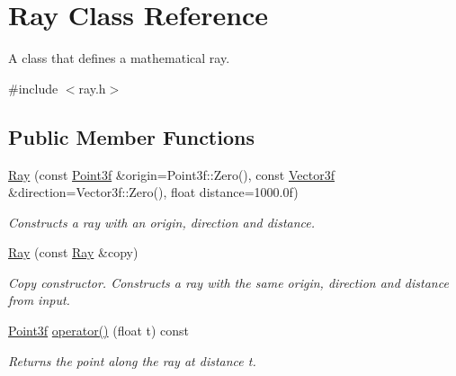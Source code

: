 \hypertarget{class_ray}{}\section{Ray Class Reference}
\label{class_ray}


A class that defines a mathematical ray.  




{\ttfamily \#include $<$ray.\+h$>$}

\subsection*{Public Member Functions}
\begin{DoxyCompactItemize}
\item 
\mbox{\hyperlink{class_ray_a2a7cfa3d7fc1cf6bb6365fb21b48a0b0}{Ray}} (const \mbox{\hyperlink{class_point}{Point3f}} \&origin=Point3f\+::\+Zero(), const \mbox{\hyperlink{class_vector3}{Vector3f}} \&direction=Vector3f\+::\+Zero(), float distance=1000.\+0f)
\begin{DoxyCompactList}\small\item\em Constructs a ray with an origin, direction and distance. \end{DoxyCompactList}\item 
\mbox{\hyperlink{class_ray_a4b5f0e9f2876ee83f90059c657bf5fa8}{Ray}} (const \mbox{\hyperlink{class_ray}{Ray}} \&copy)
\begin{DoxyCompactList}\small\item\em Copy constructor. Constructs a ray with the same origin, direction and distance from input. \end{DoxyCompactList}\item 
\mbox{\hyperlink{class_point}{Point3f}} \mbox{\hyperlink{class_ray_a89105097d4add5018efa0795ee9cfb44}{operator()}} (float t) const
\begin{DoxyCompactList}\small\item\em Returns the point along the ray at distance t. \end{DoxyCompactList}\end{DoxyCompactItemize}
